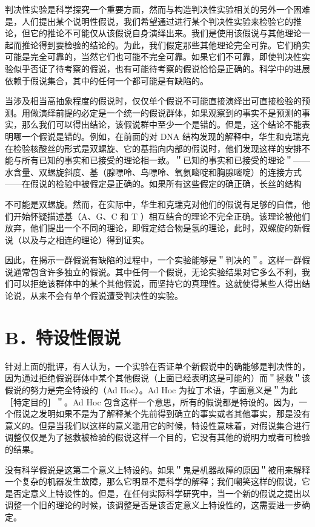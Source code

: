 判决性实验是科学探究一个重要方面，然而与构造判决性实验相关的另外一个困难是，人们提出某个说明性假说，我们希望通过进行某个判决性实验来检验它的推论，但它的推论不可能仅从该假说自身演绎出来。我们是使用该假说与其他理论一起而推论得到要检验的结论的。为此，我们假定那些其他理论完全可靠。它们确实可能是完全可靠的，当然它们也可能不完全可靠。如果它们不可靠，即使判决性实验似乎否证了待考察的假说，也有可能待考察的假说恰恰是正确的。科学中的进展依赖于假说集合，其中的任何一个都可能是有缺陷的。

当涉及相当高抽象程度的假说时，仅仅单个假说不可能直接演绎出可直接检验的预测。用做演绎前提的必定是一个统一的假说群体，如果观察到的事实不是预测的事实，那么我们可以得出结论，该假说群中至少一个是错的。但是，这个结论不能表明哪一个假说是错的。例如，在前面的对 DNA 结构发现的解释中，华生和克瑞克在检验核酸丝的形式是双螺旋、它的基指向内部的假说时，他们发现这样的安排不能与所有已知的事实和已接受的理论相一致。＂已知的事实和已接受的理论＂——水含量、双螺旋斜度、基（腺嘌呤、鸟嘌呤、氧氨嘧啶和胸腺嘧啶）的连接方式——在假说的检验中被假定是正确的。如果所有这些假定的确正确，长丝的结构

不可能是双螺旋。然而，在实际中，华生和克瑞克对他们的假说有足够的自信，他们开始怀疑描述基（A、G、C 和 T ）相互结合的理论不完全正确。该理论被他们放弃，他们提出一个不同的理论，即假定结合物是氢的理论，此时，双螺旋的新假说（以及与之相连的理论）得到证实。

因此，在揭示一群假说有缺陷的过程中，一个实验能够是＂判决的＂。这样一群假说通常包含许多独立的假说。其中任何一个假说，无论实验结果对它多么不利，我们可以拒绝该群体中的某个其他假说，而坚持它的真理性。这就使得某些人得出结论说，从来不会有单个假说遭受判决性的实验。

\section*{B．特设性假说}
针对上面的批评，有人认为，一个实验在否证单个新假说中的确能够是判决性的，因为通过拒绝假说群体中某个其他假说（上面已经表明这是可能的）而＂拯救＂该假说的努力是完全特设的（Ad Hoc）。Ad Hoc 为拉丁术语，字面意义是＂为此［特定目的］＂。Ad Hoc 包含这样一个意思，所有的假说都是特设的。因为，一个假说之发明如果不是为了解释某个先前得到确立的事实或者其他事实，那是没有意义的。但是当我们以这样的意义滥用它的时候，特设性意味着，对假说集合进行调整仅仅是为了拯救被检验的假说这样一个目的，它没有其他的说明力或者可检验的结果。

没有科学假说是这第二个意义上特设的。如果＂鬼是机器故障的原因＂被用来解释一个复杂的机器发生故障，那么它明显不是科学的解释；我们嘲笑这样的假说，它是否定意义上特设性的。但是，在任何实际科学研究中，当一个新的假说之提出以调整一个旧的理论的时候，该调整是否是该否定意义上特设性的，这需要进一步确定。

